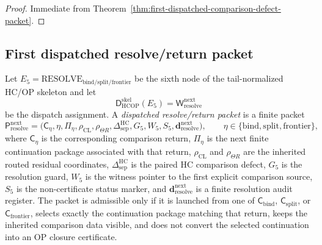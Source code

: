 \begin{proof}
Immediate from Theorem~\ref{thm:first-dispatched-comparison-defect-packet}.
\end{proof}

\subsection{First dispatched resolve/return packet}
\label{subsec:first-dispatched-resolve-return-packet}

\begin{definition}
\label{def:dispatched-resolve-return-packet}
Let \(E_5=\mathrm{RESOLVE}_{\mathrm{bind/split/frontier}}\) be the sixth node of the tail-normalized HC/OP skeleton and let
\[
 \mathsf D_{\mathrm{HCOP}}^{\mathrm{skel}}(E_5)
 =
 \mathsf W_{\mathrm{resolve}}^{\mathrm{next}}
\]
be the dispatch assignment. A \emph{dispatched resolve/return packet} is a finite packet
\[
 \mathsf P_{\mathrm{resolve}}^{\mathrm{next}}
 =
 \bigl(\mathsf C_{\eta},\eta,\Pi_{\eta},
 \rho_{\mathrm{CL}},\rho_{\Theta R},
 \Delta_{\mathrm{sep}}^{\mathrm{HC}},
 G_5,W_5,S_5,
 \mathbf d_{\mathrm{resolve}}^{\mathrm{next}}\bigr),
 \qquad
 \eta\in\{\mathrm{bind},\mathrm{split},\mathrm{frontier}\},
\]
where \(\mathsf C_{\eta}\) is the corresponding comparison return, \(\Pi_{\eta}\) is the next finite continuation package associated with that return, \(\rho_{\mathrm{CL}}\) and \(\rho_{\Theta R}\) are the inherited routed residual coordinates, \(\Delta_{\mathrm{sep}}^{\mathrm{HC}}\) is the paired HC comparison defect, \(G_5\) is the resolution guard, \(W_5\) is the witness pointer to the first explicit comparison source, \(S_5\) is the non-certificate status marker, and \(\mathbf d_{\mathrm{resolve}}^{\mathrm{next}}\) is a finite resolution audit register. The packet is admissible only if it is launched from one of \(\mathsf C_{\mathrm{bind}}\), \(\mathsf C_{\mathrm{split}}\), or \(\mathsf C_{\mathrm{frontier}}\), selects exactly the continuation package matching that return, keeps the inherited comparison data visible, and does not convert the selected continuation into an OP closure certificate.
\end{definition}

